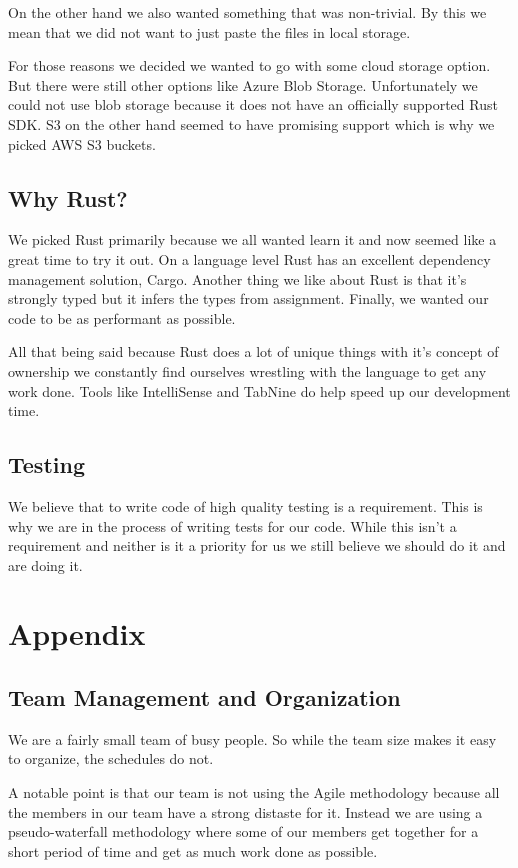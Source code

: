 \documentclass[conference]{IEEEtran}
\begin{document}
On the other hand we also wanted something that was non-trivial.
By this we mean that we did not want to just paste the files in local storage.

For those reasons we decided we wanted to go with some cloud storage option.
But there were still other options like Azure Blob Storage.
Unfortunately we could not use blob storage because it does not have an officially supported Rust SDK.
S3 on the other hand seemed to have promising support which is why we picked AWS S3 buckets.

\subsection{Why Rust?}

We picked Rust primarily because we all wanted learn it and now seemed like a great time to try it out.
On a language level Rust has an excellent dependency management solution, Cargo.
Another thing we like about Rust is that it's strongly typed but it infers the types from assignment.
Finally, we wanted our code to be as performant as possible.

All that being said because Rust does a lot of unique things with it's concept of ownership we constantly
find ourselves wrestling with the language to get any work done.
Tools like IntelliSense and TabNine do help speed up our development time.

\subsection{Testing}

We believe that to write code of high quality testing is a requirement.
This is why we are in the process of writing tests for our code.
While this isn't a requirement and neither is it a priority for us we still believe we should do it and are doing it.

\section{Appendix}
\subsection{Team Management and Organization}
We are a fairly small team of busy people.
So while the team size makes it easy to organize, the schedules do not.

A notable point is that our team is not using the Agile methodology because
all the members in our team have a strong distaste for it.
Instead we are using a pseudo-waterfall methodology where some of our members get together
for a short period of time and get as much work done as possible.
\end{document}

